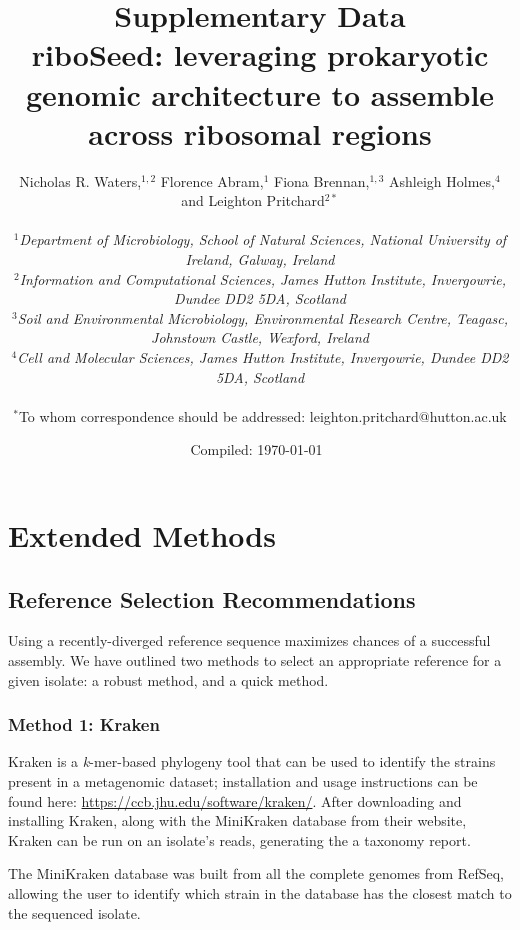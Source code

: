 \documentclass[10pt]{article}
\title{\textbf{Supplementary Data}\\ \fontseries{m}\selectfont riboSeed: leveraging prokaryotic genomic architecture to assemble across ribosomal regions}
\author
{\small Nicholas R. Waters,$^{1,2}$ Florence Abram,$^{1}$ Fiona Brennan,$^{1,3}$ Ashleigh Holmes,$^{4}$ and Leighton Pritchard$^{2\ast}$\\
\\
\normalsize{\textit {$^{1}$Department of Microbiology, School of Natural Sciences, National University of Ireland, Galway, Ireland}}\\
\normalsize{\textit {$^{2}$Information and Computational Sciences, James Hutton Institute, Invergowrie, Dundee DD2 5DA, Scotland}}\\
\normalsize{\textit {$^{3}$Soil and Environmental Microbiology, Environmental Research Centre, Teagasc, Johnstown Castle, Wexford, Ireland}}\\
\normalsize{\textit {$^{4}$Cell and Molecular Sciences, James Hutton Institute, Invergowrie, Dundee DD2 5DA, Scotland}}\\
\\
\footnotesize{$^\ast$To whom correspondence should be addressed: leighton.pritchard@hutton.ac.uk}
}
\date{}
\newcommand{\beginsupplement}{%
  \setcounter{table}{0}
  \renewcommand{\thetable}{S\arabic{table}}%
  \setcounter{figure}{0}
  \renewcommand{\thefigure}{S\arabic{figure}}%
}
\begin{document}
\baselineskip20pt  %
\maketitle
\vspace*{-1.5cm}
{\begin{center}\footnotesize\date{Compiled: \today ~\currenttime}\end{center}}

\beginsupplement





\pagebreak


\section*{Extended Methods}

\subsection*{Reference Selection Recommendations}
Using a recently-diverged reference sequence maximizes chances of a successful assembly. We have outlined two methods to select an appropriate reference for a given isolate: a robust method, and a quick method.

\subsubsection*{Method 1: Kraken}

Kraken \cite{Wood2014} is a \textit{k}-mer-based phylogeny tool that can be used to identify the strains present in a metagenomic dataset; installation and usage instructions can be found here: \href{https://ccb.jhu.edu/software/kraken/}{https://ccb.jhu.edu/software/kraken/}. After downloading and installing Kraken, along with the MiniKraken database from their website, Kraken can be run on an isolate's reads, generating the a taxonomy report.

The MiniKraken database was built from all the complete genomes from RefSeq, allowing the user to identify which strain in the database has the closest match to the sequenced isolate.
\end{document}
